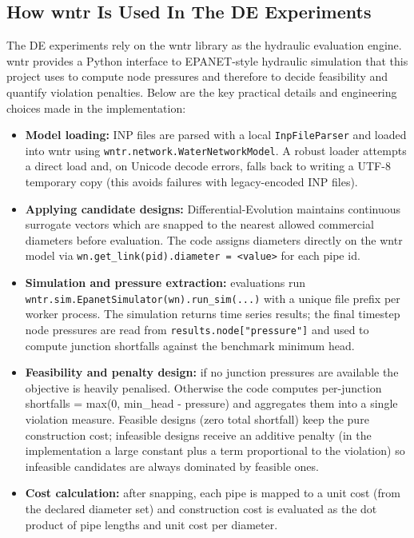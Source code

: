 \documentclass[12pt, a4paper]{article}
\begin{document}
\subsection{How wntr Is Used In The DE Experiments}

The DE experiments rely on the wntr library as the hydraulic evaluation engine. wntr provides a Python interface to EPANET-style hydraulic simulation that this project uses to compute node pressures and therefore to decide feasibility and quantify violation penalties. Below are the key practical details and engineering choices made in the implementation:

\begin{itemize}
	\item \textbf{Model loading:} INP files are parsed with a local \texttt{InpFileParser} and loaded into wntr using \texttt{wntr.network.WaterNetworkModel}. A robust loader attempts a direct load and, on Unicode decode errors, falls back to writing a UTF-8 temporary copy (this avoids failures with legacy-encoded INP files).
	\item \textbf{Applying candidate designs:} Differential-Evolution maintains continuous surrogate vectors which are snapped to the nearest allowed commercial diameters before evaluation. The code assigns diameters directly on the wntr model via \texttt{wn.get\_link(pid).diameter = <value>} for each pipe id.
	\item \textbf{Simulation and pressure extraction:} evaluations run \\ \texttt{wntr.sim.EpanetSimulator(wn).run\_sim(...)} with a unique file prefix per worker process. The simulation returns time series results; the final timestep node pressures are read from \texttt{results.node["pressure"]} and used to compute junction shortfalls against the benchmark minimum head.
	\item \textbf{Feasibility and penalty design:} if no junction pressures are available the objective is heavily penalised. Otherwise the code computes per-junction shortfalls = max(0, min\_head - pressure) and aggregates them into a single violation measure. Feasible designs (zero total shortfall) keep the pure construction cost; infeasible designs receive an additive penalty (in the implementation a large constant plus a term proportional to the violation) so infeasible candidates are always dominated by feasible ones.
	\item \textbf{Cost calculation:} after snapping, each pipe is mapped to a unit cost (from the declared diameter set) and construction cost is evaluated as the dot product of pipe lengths and unit cost per diameter.

\end{itemize}
\end{document}
